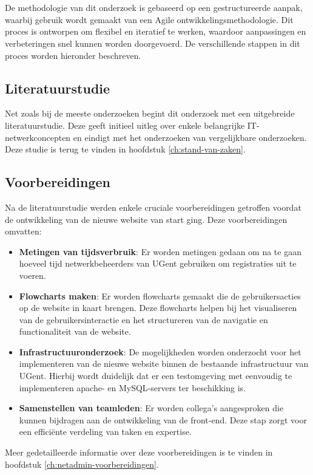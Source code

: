 
\chapter{}%
\label{ch:methodologie}
De methodologie van dit onderzoek is gebaseerd op een gestructureerde aanpak, waarbij gebruik wordt gemaakt van een Agile ontwikkelingsmethodologie. Dit proces is ontworpen om flexibel en iteratief te werken, waardoor aanpassingen en verbeteringen snel kunnen worden doorgevoerd. De verschillende stappen in dit proces worden hieronder beschreven.

\section{Literatuurstudie}
Net zoals bij de meeste onderzoeken begint dit onderzoek met een uitgebreide literatuurstudie. Deze geeft initieel uitleg over enkele belangrijke IT-netwerkconcepten en eindigt met het onderzoeken van vergelijkbare onderzoeken. Deze studie is terug te vinden in hoofdstuk \ref{ch:stand-van-zaken}.

\section{Voorbereidingen}
Na de literatuurstudie werden enkele cruciale voorbereidingen getroffen voordat de ontwikkeling van de nieuwe website van start ging. Deze voorbereidingen omvatten:
\begin{itemize}
    \item \textbf{Metingen van tijdsverbruik}: Er worden metingen gedaan om na te gaan hoeveel tijd netwerkbeheerders van UGent gebruiken om registraties uit te voeren.
    \item \textbf{Flowcharts maken}: Er worden flowcharts gemaakt die de gebruikersacties op de website in kaart brengen. Deze flowcharts helpen bij het visualiseren van de gebruikersinteractie en het structureren van de navigatie en functionaliteit van de website.
    \item \textbf{Infrastructuuronderzoek}: De mogelijkheden worden onderzocht voor het implementeren van de nieuwe website binnen de bestaande infrastructuur van UGent. Hierbij wordt duidelijk dat er een testomgeving met eenvoudig te implementeren apache- en MySQL-servers ter beschikking is.
    \item \textbf{Samenstellen van teamleden}: Er worden collega's aangesproken die kunnen bijdragen aan de ontwikkeling van de front-end. Deze stap zorgt voor een efficiënte verdeling van taken en expertise.
\end{itemize}
Meer gedetailleerde informatie over deze voorbereidingen is te vinden in hoofdstuk \ref{ch:netadmin-voorbereidingen}.

